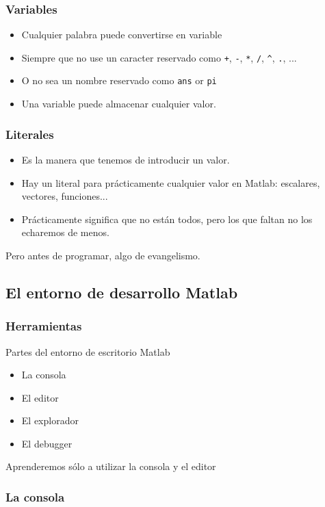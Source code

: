 \documentclass[12pt]{beamer}
\begin{document}
\begin{frame}
  \frametitle{Variables}
  \begin{itemize}
  \item Cualquier palabra puede convertirse en variable
  \item Siempre que no use un caracter reservado como \texttt{+},
    \texttt{-}, \texttt{*}, \texttt{/}, \texttt{\^}, \texttt{.}, ...
  \item O no sea un nombre reservado como \texttt{ans} or \texttt{pi}
  \item Una variable puede almacenar cualquier valor.
  \end{itemize}
\end{frame}

\begin{frame}
  \frametitle{Literales}
  \begin{itemize}
  \item Es la manera que tenemos de introducir un valor.
  \item Hay un literal para prácticamente cualquier valor en Matlab:
    escalares, vectores, funciones...
  \item Prácticamente significa que no están todos, pero los que
    faltan no los echaremos de menos.
  \end{itemize}
\pause
Pero antes de programar, algo de evangelismo.
\end{frame}

\subsection{El entorno de desarrollo Matlab}
\begin{frame}
  \frametitle{Herramientas}
Partes del entorno de escritorio Matlab
\begin{itemize}
\item La consola
\item El editor
\item El explorador
\item El debugger
\end{itemize}
Aprenderemos sólo a utilizar la consola y el editor
\end{frame}

\begin{frame}
  \frametitle{La consola}


\end{frame}
\end{document}
